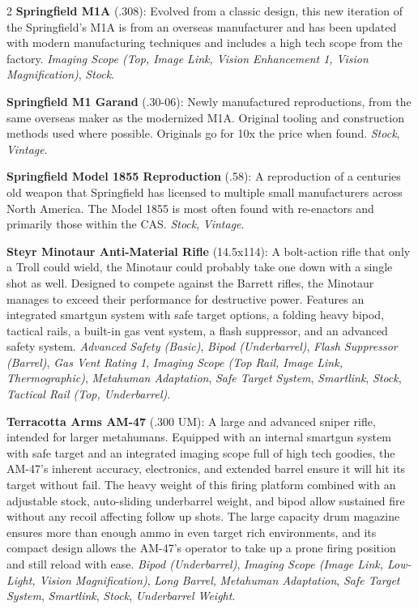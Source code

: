 \documentclass[
  oneside]{article}
\begin{document}
\begin{multicols}{2}
\textbf{Springfield M1A} (.308): Evolved from a
classic design, this new iteration of the
Springfield's M1A is from an overseas manufacturer
and has been updated with modern manufacturing
techniques and includes a high tech scope from the
factory. \emph{Imaging Scope (Top, Image Link,
Vision Enhancement 1, Vision Magnification)},
\emph{Stock}.

\textbf{Springfield M1 Garand} (.30-06): Newly
manufactured reproductions, from the same overseas
maker as the modernized M1A. Original tooling and
construction methods used where possible.
Originals go for 10x the price when found.
\emph{Stock}, \emph{Vintage}.

\textbf{Springfield Model 1855 Reproduction}
(.58): A reproduction of a centuries old weapon
that Springfield has licensed to multiple small
manufacturers across North America. The Model 1855
is most often found with re-enactors and primarily
those within the CAS. \emph{Stock},
\emph{Vintage}.

\textbf{Steyr Minotaur Anti-Material Rifle}
(14.5x114): A bolt-action rifle that only a Troll
could wield, the Minotaur could probably take one
down with a single shot as well. Designed to
compete against the Barrett rifles, the Minotaur
manages to exceed their performance for
destructive power. Features an integrated smartgun
system with safe target options, a folding heavy
bipod, tactical rails, a built-in gas vent system,
a flash suppressor, and an advanced safety system.
\emph{Advanced Safety (Basic)}, \emph{Bipod
(Underbarrel)}, \emph{Flash Suppressor (Barrel)},
\emph{Gas Vent Rating 1}, \emph{Imaging Scope (Top
Rail, Image Link, Thermographic)}, \emph{Metahuman
Adaptation}, \emph{Safe Target System},
\emph{Smartlink}, \emph{Stock}, \emph{Tactical
Rail (Top, Underbarrel)}.

\textbf{Terracotta Arms AM-47} (.300 UM): A large
and advanced sniper rifle, intended for larger
metahumans. Equipped with an internal smartgun
system with safe target and an integrated imaging
scope full of high tech goodies, the AM-47's
inherent accuracy, electronics, and extended
barrel ensure it will hit its target without fail.
The heavy weight of this firing platform combined
with an adjustable stock, auto-sliding underbarrel
weight, and bipod allow sustained fire without any
recoil affecting follow up shots. The large
capacity drum magazine ensures more than enough
ammo in even target rich environments, and its
compact design allows the AM-47's operator to take
up a prone firing position and still reload with
ease. \emph{Bipod (Underbarrel)}, \emph{Imaging
Scope (Image Link, Low-Light, Vision
Magnification)}, \emph{Long Barrel},
\emph{Metahuman Adaptation}, \emph{Safe Target
System}, \emph{Smartlink}, \emph{Stock},
\emph{Underbarrel Weight}.


\end{multicols}
\end{document}
